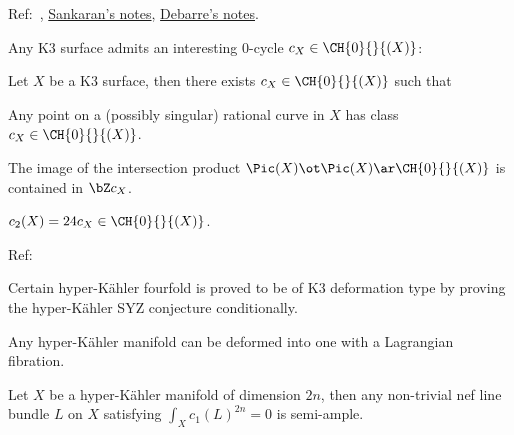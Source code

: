 \documentclass[article, a4paper, twoside]{universal}
\begin{document}

Ref:~\cite{Huybrechts1999}, \href{https://people.bath.ac.uk/masgks/Papers/kinosaki19.pdf}{Sankaran's notes}, \href{https://www.math.ens.psl.eu/~debarre/HKmanifolds.pdf}{Debarre's notes}.


Any K3 surface admits an interesting $0$-cycle $c_{X}\in\CH{0}{}{(X)}$:
\begin{thm}[{\cite[Theorem~1]{BV2004}}]
	Let $X$ be a K3 surface, then there exists $c_{X}\in\CH{0}{}{(X)}$ such that
	\begin{enr}
		\item Any point on a (possibly singular) rational curve in $X$ has class $c_{X}\in\CH{0}{}{(X)}$.
		\item The image of the intersection product $\Pic(X)\ot\Pic(X)\ar\CH{0}{}{(X)}$ is contained in $\bZ c_{X}$.
		\item $c_{2}(X)=24c_{X}\in\CH{0}{}{(X)}$.
	\end{enr}
\end{thm}



Ref:~\cite{DHMV2024}

Certain hyper-K{\"a}hler fourfold is proved to be of K3\ts{[2]} deformation type by proving the hyper-K{\"a}hler SYZ conjecture conditionally.

\begin{cnj}
	Any hyper-K{\"a}hler manifold can be deformed into one with a Lagrangian fibration.
\end{cnj}

\begin{cnj}
	Let $X$ be a hyper-K{\"a}hler manifold of dimension $2n$, then any non-trivial nef line bundle $L$ on $X$ satisfying $\int_{X}c_{1}(L)^{2n}=0$ is semi-ample.
\end{cnj}


\printref
\end{document}
